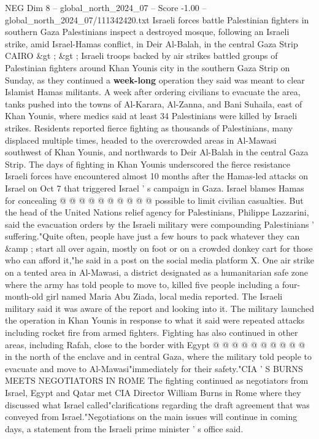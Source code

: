 \begin{textsample}{NEG Dim 8 – global\_north\_2024\_07 – Score -1.00 – global\_north\_2024\_07/111342420.txt}  \label{ex:f8_neg_182}
Israeli forces battle Palestinian fighters in southern Gaza Palestinians inspect a destroyed mosque, following an Israeli strike, amid Israel-Hamas conflict, in Deir Al-Balah, in the central Gaza Strip CAIRO \&gt ; \&gt ; Israeli troops backed by air strikes battled groups of Palestinian fighters around Khan Younis city in the southern Gaza Strip on Sunday, as they continued a \textbf{week-long} operation they said was meant to clear Islamist Hamas militants.
A week after ordering civilians to evacuate the area, tanks pushed into the towns of Al-Karara, Al-Zanna, and Bani Suhaila, east of Khan Younis, where medics said at least 34 Palestinians were killed by Israeli strikes.
Residents reported fierce fighting as thousands of Palestinians, many displaced multiple times, headed to the overcrowded areas in Al-Mawasi southwest of Khan Younis, and northwards to Deir Al-Balah in the central Gaza Strip.
The days of fighting in Khan Younis underscored the fierce resistance Israeli forces have encountered almost 10 months after the Hamas-led attacks on Israel on Oct 7 that triggered Israel ' s campaign in Gaza.
Israel blames Hamas for concealing @ @ @ @ @ @ @ @ @ @ possible to limit civilian casualties.
But the head of the United Nations relief agency for Palestinians, Philippe Lazzarini, said the evacuation orders by the Israeli military were compounding Palestinians ' suffering."Quite often, people have just a few hours to pack whatever they can \&amp ; start all over again, mostly on foot or on a crowded donkey cart for those who can afford it,"he said in a post on the social media platform X.
One air strike on a tented area in Al-Mawasi, a district designated as a humanitarian safe zone where the army has told people to move to, killed five people including a four-month-old girl named Maria Abu Ziada, local media reported.
The Israeli military said it was aware of the report and looking into it.
The military launched the operation in Khan Younis in response to what it said were repeated attacks including rocket fire from armed fighters.
Fighting has also continued in other areas, including Rafah, close to the border with Egypt @ @ @ @ @ @ @ @ @ @ in the north of the enclave and in central Gaza, where the military told people to evacuate and move to Al-Mawasi"immediately for their safety."CIA ' S BURNS MEETS NEGOTIATORS IN ROME The fighting continued as negotiators from Israel, Egypt and Qatar met CIA Director William Burns in Rome where they discussed what Israel called"clarifications regarding the draft agreement that was conveyed from Israel."Negotiations on the main issues will continue in coming days, a statement from the Israeli prime minister ' s office said.

\end{textsample}
